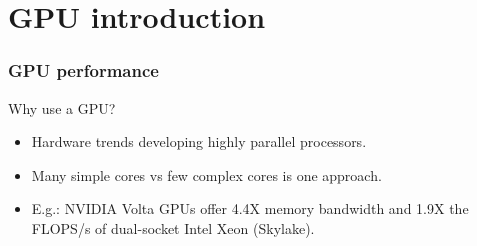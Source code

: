\documentclass{beamer}
\begin{document}
\section{GPU introduction}
\begin{frame}
\frametitle{GPU performance}
Why use a GPU?
\begin{itemize}
  \item Hardware trends developing highly parallel processors.
  \item Many simple cores vs few complex cores is one approach.
  \item E.g.: NVIDIA Volta GPUs offer 4.4X memory bandwidth and 1.9X the FLOPS/s of dual-socket Intel Xeon (Skylake).
\end{itemize}


\begin{columns}
\begin{column}{0.5\textwidth}
\begin{adjustbox}{max width={\textwidth}}
\end{adjustbox}
\end{column}

\begin{column}{0.5\textwidth}
\begin{adjustbox}{max width={\textwidth}}
\end{adjustbox}
\end{column}
\end{columns}

\end{frame}
\end{document}
